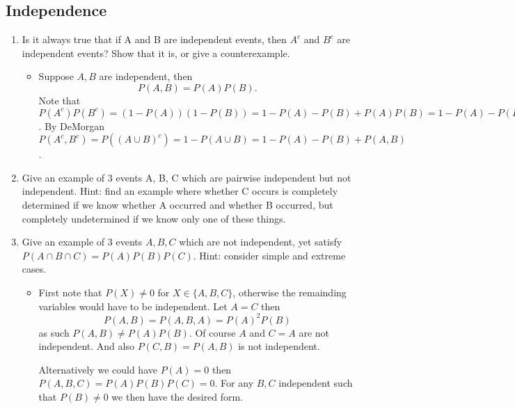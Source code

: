 \documentclass{article}
\begin{document}
\subsection{Independence}
\begin{enumerate}
	\item Is it always true that if A and B are independent events, then $A^c$ and $B^c$ are independent events? Show that it is, or give a counterexample.
		\begin{itemize}
			\item Suppose $A, B$ are independent, then
			$$
			P(A, B) = P(A)P(B).
			$$
			Note that $P(A^c)P(B^c) = (1 - P(A))(1 - P(B)) = 1 - P(A) - P(B) + P(A)P(B) = 1 - P(A) - P(B) + P(A, B)$. By DeMorgan $P(A^c, B^c) = P((A \cup B)^c) = 1 - P(A \cup B) = 1 - P(A) - P(B) + P(A, B)$.
		\end{itemize}
	\item Give an example of 3 events A, B, C which are pairwise independent but not independent. Hint: find an example where whether C occurs is completely determined if we know whether A occurred and whether B occurred, but completely undetermined if we know only one of these things.
	\item Give an example of $3$ events $A, B, C$ which are not independent, yet satisfy $P(A \cap B \cap C) = P(A)P(B)P(C)$. Hint: consider simple and extreme cases.
		\begin{itemize}
			\item First note that $P(X) \neq 0$ for $X \in \{A, B, C\}$, otherwise the remainding variables would have to be independent. Let $A = C$ then
			$$
			P(A, B) = P(A, B, A) = P(A)^2 P(B)
			$$
			as such $P(A, B) \neq P(A)P(B)$. Of course $A$ and $C = A$ are not independent. And also $P(C, B) = P(A, B)$ is not independent.

			Alternatively we could have $P(A) = 0$ then $P(A, B, C) = P(A)P(B)P(C) = 0$. For any $B, C$ independent such that $P(B) \neq 0$ we then have the desired form.
		\end{itemize}
\end{enumerate}
\end{document}
